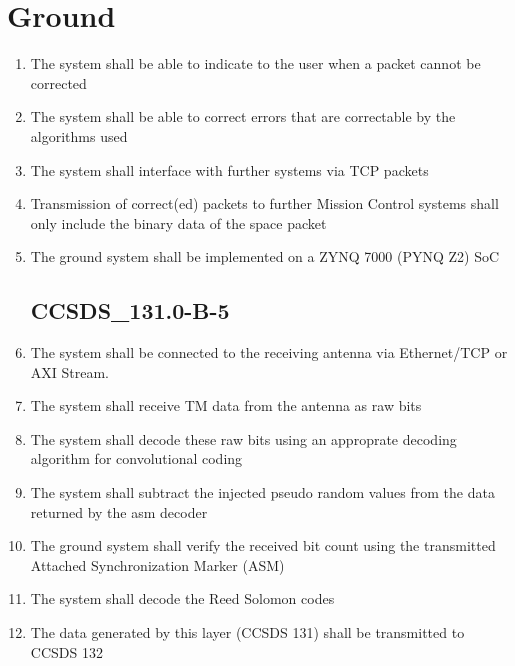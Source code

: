 \section{Ground}
\begin{enumerate}[leftmargin=\dimexpr\linewidth-13cm-\rightmargin\relax,label={\bfseries{GND-REQ-\arabic*}}]
    \item The system shall be able to indicate to the user when a packet cannot be corrected
    \item The system shall be able to correct errors that are correctable by the algorithms used
    \item The system shall interface with further systems via TCP packets
    \item Transmission of correct(ed) packets to further Mission Control systems shall only include the binary data of the space packet
    \item The ground system shall be implemented on a ZYNQ 7000 (PYNQ Z2) SoC

\subsection{CCSDS\_131.0-B-5}
    \item The system shall be connected to the receiving antenna via Ethernet/TCP or AXI Stream.
    \item The system shall receive TM data from the antenna as raw bits
    \item The system shall decode these raw bits using an approprate decoding algorithm for convolutional coding    
    \item The system shall subtract the injected pseudo random values from the data returned by the asm decoder
    \item The ground system shall verify the received bit count using the transmitted Attached Synchronization Marker (ASM)    
    \item The system shall decode the Reed Solomon codes
    \item The data generated by this layer (CCSDS 131) shall be transmitted to CCSDS 132



\end{enumerate}
